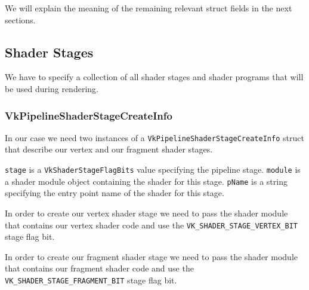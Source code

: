 We will explain the meaning of the remaining relevant struct fields
in the next sections.

\begin{minipage}{\linewidth}{\noindent}
    
\end{minipage}

\subsection{Shader Stages}

We have to specify a collection of all shader stages and shader programs that
will be used during rendering.

\begin{minipage}{\linewidth}{\noindent}
    
\end{minipage}

\subsubsection{VkPipelineShaderStageCreateInfo}

In our case we need two instances of a \texttt{VkPipelineShaderStageCreateInfo}
struct that describe our vertex and our fragment shader stages.

\texttt{stage} is a \texttt{VkShaderStageFlagBits} value specifying the
pipeline stage.
\texttt{module} is a shader module object containing the shader for this stage.
\texttt{pName} is a string specifying the entry point name of the shader for this
stage.

\begin{minipage}{\linewidth}{\noindent}
    
\end{minipage}

In order to create our vertex shader stage we need to pass the shader module
that contains our vertex shader code and use the
\texttt{VK\_SHADER\_STAGE\_VERTEX\_BIT} stage flag bit.

In order to create our fragment shader stage we need to pass the shader module
that contains our fragment shader code and use the
\texttt{VK\_SHADER\_STAGE\_FRAGMENT\_BIT} stage flag bit.

